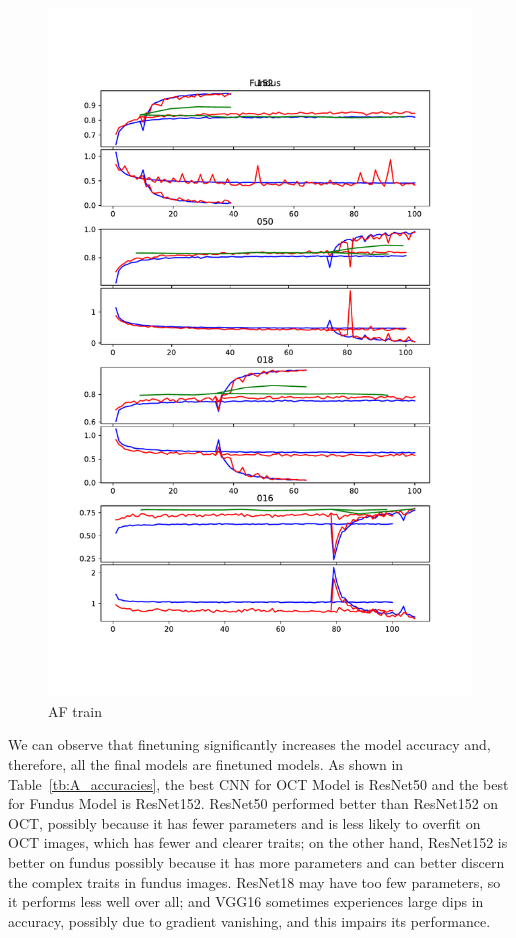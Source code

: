 \documentclass{article}
\begin{document}
	\begin{figure}[htbp]
		\centering
		\includegraphics[width=\linewidth]{Figs/abnormity_Fundus_loss_and_acc.pdf}
		\caption{AF train}
		\vspace{0.3cm}
		\label{fig:AF_train}
	\end{figure}
	
	\vspace{0.3cm}
	
	We can observe that finetuning significantly increases the model accuracy and, therefore, all the final models are finetuned models. As shown in Table~\ref{tb:A_accuracies}, the best CNN for OCT Model is ResNet50 and the best for Fundus Model is ResNet152. ResNet50 performed better than ResNet152 on OCT, possibly because it has fewer parameters and is less likely to overfit on OCT images, which has fewer and clearer traits; on the other hand, ResNet152 is better on fundus possibly because it has more parameters and can better discern the complex traits in fundus images. ResNet18 may have too few parameters, so it performs less well over all; and VGG16 sometimes experiences large dips in accuracy, possibly due to gradient vanishing, and this impairs its performance. 
	
\end{document}
